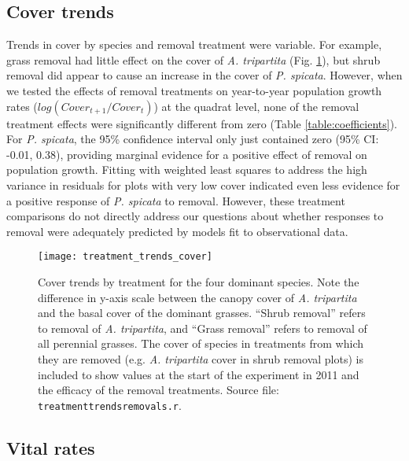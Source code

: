 \documentclass[11pt]{article}
\begin{document}
\begin{doublespacing}
\subsection*{Cover trends}

Trends in cover by species and removal treatment were variable. For example, grass removal had little effect on the cover of \textit{A. tripartita} 
(Fig. \ref{fig:CoverTrends}), but shrub removal did appear to cause an increase in the cover of \textit{P. spicata}. 
However, when we tested the effects of removal treatments on year-to-year population growth rates ($log(Cover_{t+1}/Cover_t)$) at the quadrat level,
 none of the removal treatment effects were significantly different from zero (Table \ref{table:coefficients}). For \textit{P. spicata}, 
the 95\% confidence interval only just contained zero (95\% CI: -0.01, 0.38), providing marginal evidence for a positive effect of removal on population growth. 
Fitting with weighted least squares to address the high variance in residuals for plots with very low cover indicated even less evidence for a positive 
response of  \textit{P. spicata} to removal. However, these treatment comparisons do not directly address our questions about whether 
responses to removal were adequately predicted by models fit to observational data. 

\begin{figure}[tbp]
\centering
\texttt{[image: treatment\_trends\_cover]}
\caption{Cover trends by treatment for the four dominant species.  Note the difference in y-axis scale between the canopy cover of \textit{A. tripartita} and 
the basal cover of the dominant grasses. ``Shrub removal'' refers to removal of \textit{A. tripartita}, and ``Grass removal'' refers to removal of all perennial grasses. 
The cover of species in treatments from which they are removed (e.g. \textit{A. tripartita} cover in shrub removal plots) is included to show values at the start 
of the experiment in 2011 and the efficacy of the removal treatments. Source file: \texttt{treatment\textunderscore trends\textunderscore removals.r}.}
\label{fig:CoverTrends}
\end{figure}


\subsection*{Vital rates}


\end{doublespacing}
\end{document}
